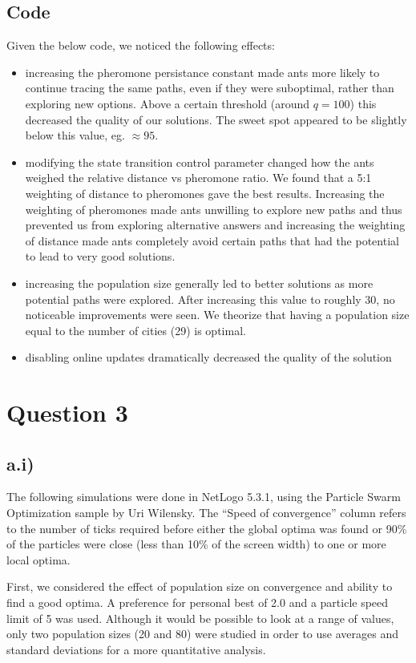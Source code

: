 \documentclass[12pt]{article}
\begin{document}
\subsection*{Code}
Given the below code, we noticed the following effects:
\begin{itemize}
\item increasing the pheromone persistance constant made ants more likely to continue tracing the same paths, even if they were suboptimal, rather than exploring new options. Above a certain threshold (around $q=100$) this decreased the quality of our solutions. The sweet spot appeared to be slightly below this value, eg. $\approx 95$.
\item modifying the state transition control parameter changed how the ants weighed the relative distance vs pheromone ratio. We found that a 5:1 weighting of distance to pheromones gave the best results. Increasing the weighting of pheromones made ants unwilling to explore new paths and thus prevented us from exploring alternative answers and increasing the weighting of distance made ants completely avoid certain paths that had the potential to lead to very good solutions.
\item increasing the population size generally led to better solutions as more potential paths were explored. After increasing this value to roughly 30, no noticeable improvements were seen. We theorize that having a population size equal to the number of cities (29) is optimal.
\item disabling online updates dramatically decreased the quality of the solution
\end{itemize}



\section*{Question 3}
\subsection*{a.i)}
The following simulations were done in NetLogo 5.3.1, using the Particle Swarm Optimization sample by Uri Wilensky. The ``Speed of convergence'' column refers to the number of ticks required before either the global optima was found or 90\% of the particles were close (less than 10\% of the screen width) to one or more local optima.

First, we considered the effect of population size on convergence and ability to find a good optima. A preference for personal best of 2.0 and a particle speed limit of 5 was used. Although it would be possible to look at a range of values, only two population sizes (20 and 80) were studied in order to use averages and standard deviations for a more quantitative analysis.
\end{document}
